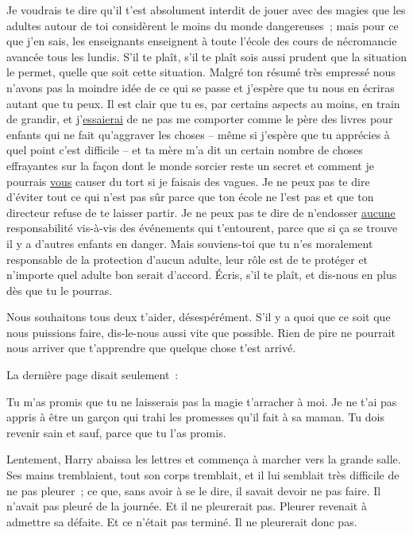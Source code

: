 \begin{writtenNote}
Je voudrais te dire qu'il t'est absolument interdit de jouer avec des magies que les adultes autour de toi considèrent le moins du monde dangereuses~; mais pour ce que j'en sais, les enseignants enseignent à toute l'école des cours de nécromancie avancée tous les lundis. S'il te plaît, s'il te plaît sois aussi prudent que la situation le permet, quelle que soit cette situation. Malgré ton résumé très empressé nous n'avons pas la moindre idée de ce qui se passe et j'espère que tu nous en écriras autant que tu peux. Il est clair que tu es, par certains aspects au moins, en train de grandir, et j'\underline{essaierai} de ne pas me comporter comme le père des livres pour enfants qui ne fait qu'aggraver les choses -- même si j'espère que tu apprécies à quel point c'est difficile -- et ta mère m'a dit un certain nombre de choses effrayantes sur la façon dont le monde sorcier reste un secret et comment je pourrais \underline{vous} causer du tort si je faisais des vagues. Je ne peux pas te dire d'éviter tout ce qui n'est pas sûr parce que ton école ne l'est pas et que ton directeur refuse de te laisser partir. Je ne peux pas te dire de n'endosser \underline{aucune} responsabilité vis-à-vis des événements qui t'entourent, parce que si ça se trouve il y a d'autres enfants en danger. Mais souviens-toi que tu n'es moralement responsable de la protection d'aucun adulte, leur rôle est de te protéger et n'importe quel adulte bon serait d'accord. Écris, s'il te plaît, et dis-nous en plus dès que tu le pourras.

Nous souhaitons tous deux t'aider, désespérément. S'il y a quoi que ce soit que nous puissions faire, dis-le-nous aussi vite que possible. Rien de pire ne pourrait nous arriver que t'apprendre que quelque chose t'est arrivé.

\end{writtenNote}

La dernière page disait seulement~:

\begin{writtenNote}
Tu m'as promis que tu ne laisserais pas la magie t'arracher à moi. Je ne t'ai pas appris à être un garçon qui trahi les promesses qu'il fait à sa maman. Tu dois revenir sain et sauf, parce que tu l'as promis.

\end{writtenNote}

Lentement, Harry abaissa les lettres et commença à marcher vers la grande salle. Ses mains tremblaient, tout son corps tremblait, et il lui semblait très difficile de ne pas pleurer~; ce que, sans avoir à se le dire, il savait devoir ne pas faire. Il n'avait pas pleuré de la journée. Et il ne pleurerait pas. Pleurer revenait à admettre sa défaite. Et ce n'était pas terminé. Il ne pleurerait donc pas.

